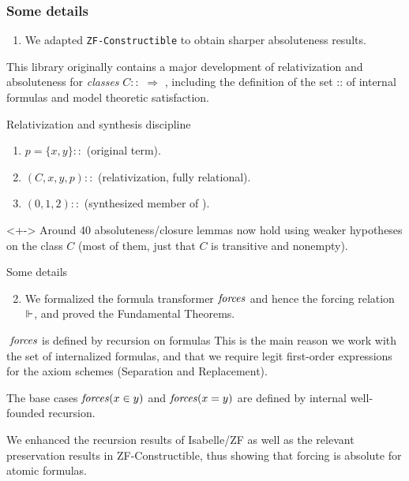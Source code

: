 \documentclass[english]{beamer}
\newcommand{\uscore}{\isacharunderscore}
\begin{document}
\begin{frame}
  \frametitle{Some details}
  \begin{alertblock}{}
    \begin{enumerate}%
    \item We adapted \texttt{ZF-Constructible} to obtain
      sharper absoluteness results.
    \end{enumerate}
  \end{alertblock}

  This library originally contains a major development of relativization and
  absoluteness for \emph{classes} $C :: {}$  $\Rightarrow$
  , including the definition of the set  ::
   of internal formulas and model theoretic satisfaction. 
  \pause
  \begin{block}{Relativization and synthesis discipline}
    \begin{enumerate}[I]
    \item<+-> $p=\{x,y\} :: {}$
      \hfill
      (original term).
    \item<+-> $(C,x,y,p) :: {}$
      \hfill
      (relativization, fully
      relational). 
    \item<+-> \isatt{upair{\uscore}fm}$(0,1,2) :: {}$ 
      \hfill
      (synthesized member of ).
    \end{enumerate}
  \end{block}
  \begin{alertblock}{}<+->
    Around 40 absoluteness/closure lemmas now hold using weaker
    hypotheses on the class $C$ (most of them, just that $C$ is
    transitive and nonempty).
  \end{alertblock}
\end{frame}

\begin{frame}{Some details}
  \begin{alertblock}{}
    \begin{enumerate}\setcounter{enumi}{1}
    \item We formalized the formula transformer $\mathit{forces}$ and
      hence the forcing relation $\Vdash$, and proved the Fundamental
      Theorems.
    \end{enumerate}
  \end{alertblock}
  \pause
  \begin{block}{$\;\mathit{forces}$ is defined by recursion on  formulas}
    This is the main reason we work with the set of internalized
    formulas, and that we require legit first-order expressions for
    the axiom schemes (Separation and Replacement).

    The base cases  $\mathit{forces}(x\in y)$ and  $\mathit{forces}(x =
    y)$ are  defined by \alert{internal} well-founded
    recursion.
  \end{block}
  \pause
  \begin{alertblock}{}
    We enhanced the recursion results of Isabelle/ZF as well as
    the relevant preservation results in ZF-Constructible, thus
    showing that forcing is absolute for atomic formulas.
  \end{alertblock}
\end{frame}
\end{document}
